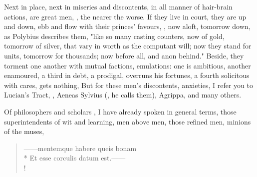Next in place, next in miseries and discontents, in all manner of hair-brain
actions, are great men, , the nearer the
worse. If they live in court, they are up and down, ebb and flow with their
princes' favours, , now aloft, tomorrow
down, as Polybius describes them, "like so many casting
counters, now of gold, tomorrow of silver, that vary in worth as the computant
will; now they stand for units, tomorrow for thousands; now before all, and
anon behind." Beside, they torment one another with mutual factions,
emulations: one is ambitious, another enamoured, a third in debt, a prodigal,
overruns his fortunes, a fourth solicitous with cares, gets nothing, \etc{} But
for these men's discontents, anxieties, I refer you to Lucian's Tract, , Aeneas Sylvius (, he calls them), Agrippa, and many others.

Of philosophers and scholars , I have already
spoken in general terms, those superintendents of wit and learning, men above
men, those refined men, minions of the muses,

\begin{latin}
\begin{verse}%
------mentemque habere queis bonam\\*
Et esse corculis datum est.------\\!
\end{verse}%
\end{latin}

